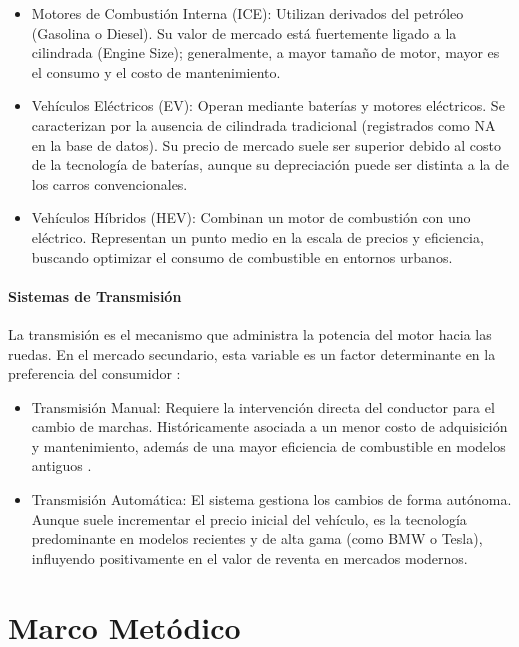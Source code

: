 \documentclass[oneside,11pt]{Latex/Classes/PhDthesisPSnPDF}
\begin{document}
\begin{itemize}
\item Motores de Combustión Interna (ICE): Utilizan derivados del petróleo (Gasolina o Diesel). Su valor de mercado está fuertemente ligado a la cilindrada (Engine Size); generalmente, a mayor tamaño de motor, mayor es el consumo y el costo de mantenimiento.

\item Vehículos Eléctricos (EV): Operan mediante baterías y motores eléctricos. Se caracterizan por la ausencia de cilindrada tradicional (registrados como NA en la base de datos). Su precio de mercado suele ser superior debido al costo de la tecnología de baterías, aunque su depreciación puede ser distinta a la de los carros convencionales.

\item Vehículos Híbridos (HEV): Combinan un motor de combustión con uno eléctrico. Representan un punto medio en la escala de precios y eficiencia, buscando optimizar el consumo de combustible en entornos urbanos.
\end{itemize}

\subsubsection {Sistemas de Transmisión}

La transmisión es el mecanismo que administra la potencia del motor
hacia las ruedas. En el mercado secundario, esta variable es un factor
determinante en la preferencia del consumidor\citep{manual}
\citep{auto}:

\begin{itemize}

\item Transmisión Manual: Requiere la intervención directa del conductor para el cambio de marchas. Históricamente asociada a un menor costo de adquisición y mantenimiento, además de una mayor eficiencia de combustible en modelos antiguos .

\item Transmisión Automática: El sistema gestiona los cambios de forma autónoma. Aunque suele incrementar el precio inicial del vehículo, es la tecnología predominante en modelos recientes y de alta gama (como BMW o Tesla), influyendo positivamente en el valor de reventa en mercados modernos.
\end{itemize}

\chapter{Marco Metódico}
\end{document}
